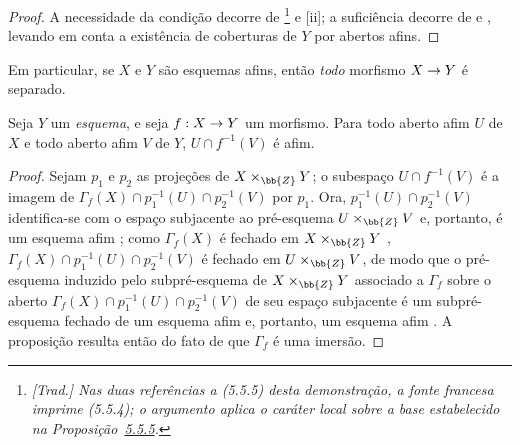 \documentclass[oneside]{amsart}
\makeatletter
\newcommand{\ega@arrow}[2]{\mathchoice{#1}{#2}{#2}{#2}}
\renewcommand{\to}{\ega@arrow{\longrightarrow}{\rightarrow}}
\newcommand{\oldpage}[2][]{{\marginnote{\normalfont\textbf{#1}~|~#2}}\ignorespaces}
\let\EGAOriginalLabel\label
\renewcommand{\label}[1]{\phantomsection\EGAOriginalLabel{#1}}
\makeatother
\begin{document}
\begin{proof}
A necessidade da condição decorre de \footnote{\emph{[Trad.]
Nas duas referências a (5.5.5) desta demonstração, a fonte francesa imprime
(5.5.4); o argumento aplica o caráter local sobre a base estabelecido na
Proposição~\hyperref[I.5.5.5]{5.5.5}.}} e [ii]; a suficiência
decorre de  e , levando em conta a existência de
coberturas de $Y$ por abertos afins.
\end{proof}

Em particular, se $X$ e $Y$ são esquemas afins, então \emph{todo} morfismo
$X\to Y$ é separado.

\begin{proposition}[5.5.10]
\label{I.5.5.10}
Seja $Y$ um \emph{esquema}, e seja $f:X\to Y$ um morfismo.
Para todo aberto afim $U$ de $X$ e todo aberto afim $V$ de $Y$,
$U\cap f^{-1}(V)$ é afim.
\end{proposition}

\begin{proof}
Sejam $p_1$ e $p_2$ as projeções de $X\times_\bb{Z}Y$;
o subespaço $U\cap f^{-1}(V)$ é a imagem de
$\Gamma_f(X)\cap p_1^{-1}(U)\cap p_2^{-1}(V)$ por $p_1$.
Ora, $p_1^{-1}(U)\cap p_2^{-1}(V)$ identifica-se com o espaço subjacente ao
\oldpage[I]{139}
pré-esquema $U\times_\bb{Z}V$  e, portanto, é um esquema afim
; como $\Gamma_f(X)$ é fechado em $X\times_\bb{Z}Y$
, $\Gamma_f(X)\cap p_1^{-1}(U)\cap p_2^{-1}(V)$ é fechado em
$U\times_\bb{Z} V$, de modo que o pré-esquema induzido pelo subpré-esquema de
$X\times_\bb{Z}Y$ associado a $\Gamma_f$  sobre o aberto
$\Gamma_f(X)\cap p_1^{-1}(U)\cap p_2^{-1}(V)$ de seu espaço subjacente é um
subpré-esquema fechado de um esquema afim e, portanto, um esquema afim
.
A proposição resulta então do fato de que $\Gamma_f$ é uma imersão.
\end{proof}
\end{document}
